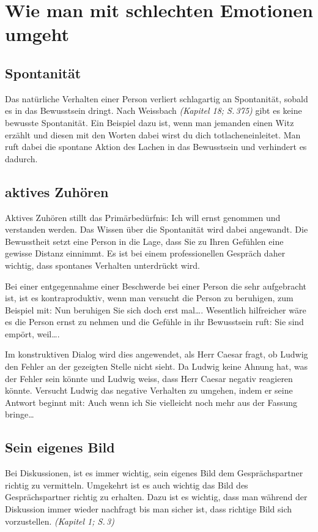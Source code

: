 \section*{Wie man mit schlechten Emotionen umgeht}
\subsection*{Spontanität}
Das natürliche Verhalten einer Person verliert schlagartig an
Spontanität, sobald es in das Bewusstsein dringt. Nach Weissbach
\textit{(Kapitel 18; S.\,375)} gibt es keine bewusste Spontanität. Ein
Beispiel dazu ist, wenn man jemanden einen Witz erzählt und diesen mit
den Worten \glqq dabei wirst du dich totlachen\grqq\text{
}einleitet. Man ruft dabei die spontane Aktion des Lachen in das
Bewusstsein und verhindert es
dadurch. %

\subsection*{aktives Zuhören}
Aktives Zuhören stillt das Primärbedürfnis: Ich will ernst genommen
und verstanden werden. Das Wissen über die Spontanität wird dabei
angewandt. Die Bewusstheit setzt eine Person in die Lage, dass Sie zu
Ihren Gefühlen eine gewisse Distanz einnimmt. Es ist bei einem
professionellen Gespräch daher wichtig, dass spontanes Verhalten
unterdrückt wird.

Bei einer entgegennahme einer Beschwerde bei einer Person die sehr
aufgebracht ist, ist es kontraproduktiv, wenn man versucht die Person
zu beruhigen, zum Beispiel mit: \glqq Nun beruhigen Sie sich doch erst
mal\dots\grqq. Wesentlich hilfreicher wäre es die Person ernst zu
nehmen und die Gefühle in ihr Bewusstsein ruft: \glqq Sie sind empört,
weil\dots\grqq.

Im konstruktiven Dialog wird dies angewendet, als Herr Caesar fragt,
ob Ludwig den Fehler an der gezeigten Stelle nicht sieht.  Da Ludwig
keine Ahnung hat, was der Fehler sein könnte und Ludwig weiss, dass
Herr Caesar negativ reagieren könnte.  Versucht Ludwig das negative
Verhalten zu umgehen, indem er seine Antwort beginnt mit: \glqq Auch
wenn ich Sie vielleicht noch mehr aus der Fassung bringe\dots\grqq

\subsection*{Sein eigenes Bild}
Bei Diskussionen, ist es immer wichtig, sein eigenes Bild dem
Gesprächspartner richtig zu vermitteln.  Umgekehrt ist es auch wichtig
das Bild des Gesprächspartner richtig zu erhalten.  Dazu ist es
wichtig, dass man während der Diskussion immer wieder nachfragt bis
man sicher ist, dass richtige Bild sich vorzustellen. \textit{(Kapitel
1; S.\,3)}

